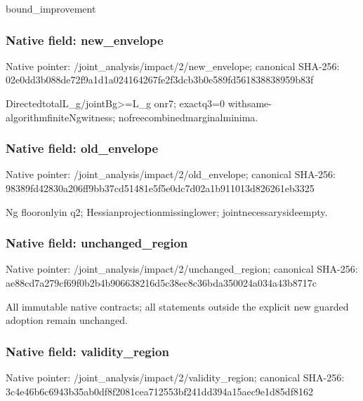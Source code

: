 \documentclass[10pt,a4paper]{article}
\begin{document}
\begingroup\raggedright\sloppy bound\_\allowbreak{}improvement\par\endgroup

\subsubsection{Native field: new\_\allowbreak{}envelope}
Native pointer: /joint\_\allowbreak{}analysis/impact/2/new\_\allowbreak{}envelope; canonical SHA-256: 02e0dd3b088de72f9a1d1a024164267fe2f3dcb3b0e589fd561838838959b83f

\begingroup\raggedright\sloppy DirectedtotalL\_\allowbreak{}g/\allowbreak{}jointBg>=\allowbreak{}L\_\allowbreak{}g onr7;\allowbreak{} exactq3=\allowbreak{}0 withsame-algorithmfiniteNgwitness;\allowbreak{} nofreecombinedmarginalminima.\par\endgroup

\subsubsection{Native field: old\_\allowbreak{}envelope}
Native pointer: /joint\_\allowbreak{}analysis/impact/2/old\_\allowbreak{}envelope; canonical SHA-256: 98389fd42830a206ff9bb37cd51481e5f5e0dc7d02a1b911013d826261eb3325

\begingroup\raggedright\sloppy Ng flooronlyin q2;\allowbreak{} Hessianprojectionmissinglower;\allowbreak{} jointnecessarysideempty.\par\endgroup

\subsubsection{Native field: unchanged\_\allowbreak{}region}
Native pointer: /joint\_\allowbreak{}analysis/impact/2/unchanged\_\allowbreak{}region; canonical SHA-256: ae88cd7a279cf69f0b2b4b906638216d5c38ec8c36bda350024a034a43b8717c

\begingroup\raggedright\sloppy All immutable native contracts;\allowbreak{} all statements outside the explicit new guarded adoption remain unchanged.\par\endgroup

\subsubsection{Native field: validity\_\allowbreak{}region}
Native pointer: /joint\_\allowbreak{}analysis/impact/2/validity\_\allowbreak{}region; canonical SHA-256: 3c4e46b6c6943b35ab0df8f2081cea712553bf241dd394a15aec9e1d85df8162
\end{document}
